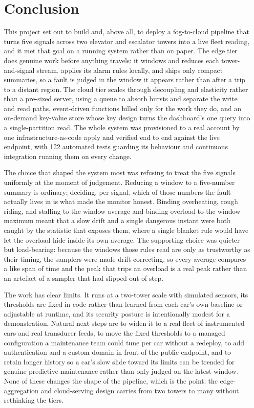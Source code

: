 \documentclass[conference]{IEEEtran}
\begin{document}
\section{Conclusion}

This project set out to build and, above all, to deploy a fog-to-cloud pipeline that turns five signals across two elevator and escalator towers into a live fleet reading, and it met that goal on a running system rather than on paper. The edge tier does genuine work before anything travels: it windows and reduces each tower-and-signal stream, applies its alarm rules locally, and ships only compact summaries, so a fault is judged in the window it appears rather than after a trip to a distant region. The cloud tier scales through decoupling and elasticity rather than a pre-sized server, using a queue to absorb bursts and separate the write and read paths, event-driven functions billed only for the work they do, and an on-demand key-value store whose key design turns the dashboard's one query into a single-partition read. The whole system was provisioned to a real account by one infrastructure-as-code apply and verified end to end against the live endpoint, with 122 automated tests guarding its behaviour and continuous integration running them on every change.

The choice that shaped the system most was refusing to treat the five signals uniformly at the moment of judgement. Reducing a window to a five-number summary is ordinary; deciding, per signal, which of those numbers the fault actually lives in is what made the monitor honest. Binding overheating, rough riding, and stalling to the window average and binding overload to the window maximum meant that a slow drift and a single dangerous instant were both caught by the statistic that exposes them, where a single blanket rule would have let the overload hide inside its own average. The supporting choice was quieter but load-bearing: because the windows those rules read are only as trustworthy as their timing, the samplers were made drift correcting, so every average compares a like span of time and the peak that trips an overload is a real peak rather than an artefact of a sampler that had slipped out of step.

The work has clear limits. It runs at a two-tower scale with simulated sensors, its thresholds are fixed in code rather than learned from each car's own baseline or adjustable at runtime, and its security posture is intentionally modest for a demonstration. Natural next steps are to widen it to a real fleet of instrumented cars and real transducer feeds, to move the fixed thresholds to a managed configuration a maintenance team could tune per car without a redeploy, to add authentication and a custom domain in front of the public endpoint, and to retain longer history so a car's slow slide toward its limits can be trended for genuine predictive maintenance rather than only judged on the latest window. None of these changes the shape of the pipeline, which is the point: the edge-aggregation and cloud-serving design carries from two towers to many without rethinking the tiers.
\end{document}
